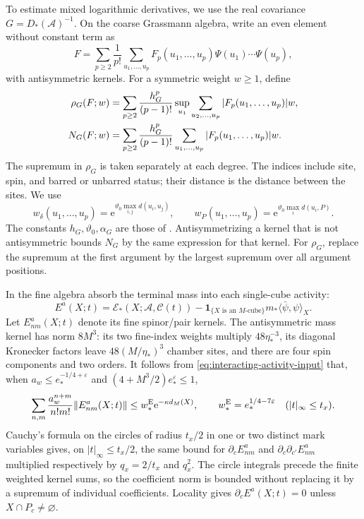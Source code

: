 \documentclass[11pt,letterpaper,reqno]{amsart}
\begin{document}
To estimate mixed logarithmic derivatives, we use the
real covariance $G=D_*(\mathscr A)^{-1}$. On the
coarse Grassmann algebra, write an even element
without constant term as
\[
 F=\sum_{p\ge2}\frac1{p!}\sum_{u_1,\ldots,u_p}
 F_p(u_1,\ldots,u_p)\Psi(u_1)\cdots\Psi(u_p),
\]
with antisymmetric kernels.
For a symmetric weight $w\ge1$, define
\begin{align}
 \rho_G(F;w)&=\sum_{p\ge2}\frac{h_G^p}{(p-1)!}
       \sup_{u_1}\sum_{u_2,\ldots,u_p}|F_p(u_1,\ldots,u_p)|w,
                                                     \notag\\
 N_G(F;w)&=\sum_{p\ge2}\frac{h_G^p}{(p-1)!}
       \sum_{u_1,\ldots,u_p}|F_p(u_1,\ldots,u_p)|w .
                                     \label{eq:interacting-tree-norms}
\end{align}
The supremum in $\rho_G$ is taken separately
at each degree. The indices include site, spin,
and barred or unbarred status; their distance
is the distance between the sites. We use
\[
 w_\delta(u_1,\ldots,u_p)=
          \mathrm e^{\vartheta_0\max_{i,j}d(u_i,u_j)},\qquad
 w_P(u_1,\ldots,u_p)=\mathrm e^{\vartheta_0\max_i d(u_i,P)} .
\]
The constants $h_G,\vartheta_0,\alpha_G$ are
those of \cite[(74)]{TerminalPressure}.
Antisymmetrizing a kernel that is not antisymmetric
bounds $N_G$ by the same expression for that
kernel. For $\rho_G$, replace the supremum at
the first argument by the largest supremum
over all argument positions.

In the fine algebra absorb the terminal mass
into each single-cube activity:
\[
 E^a(X;t)=\mathscr E_*(X;\mathscr A,\mathscr C(t))
              -\mathbf1_{\{X\text{ is an }M\text{-cube}\}}
                         m_*\langle\bar\psi,\psi\rangle_X.
\]
Let $E^a_{nm}(X;t)$ denote its fine spinor/pair
kernels. The antisymmetric mass kernel has
norm $8M^3$: its two fine-index weights multiply
$48\eta_*^{-3}$, its diagonal Kronecker factors
leave $48(M/\eta_*)^3$ chamber sites, and there
are four spin components and two orders.
It follows from \eqref{eq:interacting-activity-input}
that, when $a_w\le e_*^{-1/4+\varepsilon}$ and
$(4+M^3/2)e_*^\varepsilon\le1$,
\begin{equation}\label{eq:interacting-absorbed-activity}
 \sum_{n,m}\frac{a_w^{n+m}}{n!m!}\|E^a_{nm}(X;t)\|
          \le w_*^{\rm E}\mathrm e^{-\kappa d_M(X)},\qquad
 w_*^{\rm E}=e_*^{1/4-7\varepsilon}
                                      \quad(|t|_\infty\le t_x).
\end{equation}
Cauchy's formula on the circles of radius $t_x/2$
in one or two distinct mark variables gives,
on $|t|_\infty\le t_x/2$, the same bound
for $\partial_cE^a_{nm}$ and
$\partial_c\partial_{c'}E^a_{nm}$ multiplied
respectively by $q_x=2/t_x$ and $q_x^2$.
The circle integrals precede the finite weighted
kernel sums, so the coefficient norm is bounded
without replacing it by a supremum of individual
coefficients. Locality gives
$\partial_cE^a(X;t)=0$ unless $X\cap P_c\ne\varnothing$.
\end{document}
